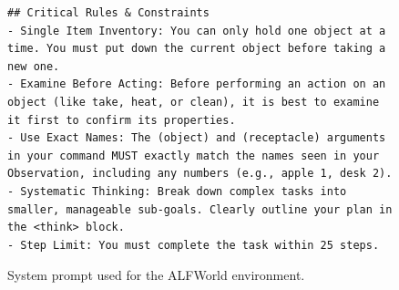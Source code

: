 \begin{figure}[h]
\begin{tcolorbox}[
        colback=gray!5,
        colframe=gray!75,
        title=ALFWorld System Prompt,
        fonttitle=\bfseries,
        width=\textwidth
    ]
\begin{lstlisting}[basicstyle=\ttfamily\scriptsize, breaklines=true]
## Critical Rules & Constraints
- Single Item Inventory: You can only hold one object at a time. You must put down the current object before taking a new one.
- Examine Before Acting: Before performing an action on an object (like take, heat, or clean), it is best to examine it first to confirm its properties.
- Use Exact Names: The (object) and (receptacle) arguments in your command MUST exactly match the names seen in your Observation, including any numbers (e.g., apple 1, desk 2).
- Systematic Thinking: Break down complex tasks into smaller, manageable sub-goals. Clearly outline your plan in the <think> block.
- Step Limit: You must complete the task within 25 steps.
    \end{lstlisting}
    \end{tcolorbox}
    \caption{System prompt used for the ALFWorld environment.}
    \label{fig:prompt_alfworld}
\end{figure}

